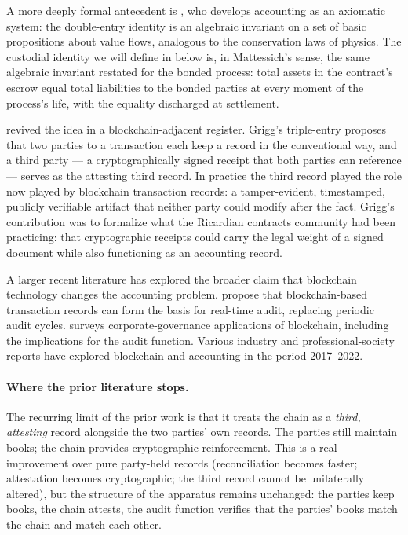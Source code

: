 \documentclass[11pt,a4paper]{article}
\theoremstyle{definition}
\theoremstyle{remark}
\begin{document}
A more deeply formal antecedent is
\citet{mattessich1964accounting}, who develops accounting as an
axiomatic system: the double-entry identity is an algebraic
invariant on a set of basic propositions about value flows,
analogous to the conservation laws of physics. The custodial
identity we will define in
 below is, in Mattessich's sense,
the same algebraic invariant restated for the bonded process:
total assets in the contract's escrow equal total liabilities to
the bonded parties at every moment of the process's life, with
the equality discharged at settlement.

\citet{grigg2005triple} revived the idea in a
blockchain-adjacent register. Grigg's triple-entry proposes
that two parties to a transaction each keep a record in the
conventional way, and a third party --- a cryptographically
signed receipt that both parties can reference --- serves as
the attesting third record. In practice the third record
played the role now played by blockchain transaction records:
a tamper-evident, timestamped, publicly verifiable artifact
that neither party could modify after the fact. Grigg's
contribution was to formalize what the Ricardian contracts
community had been practicing: that cryptographic receipts
could carry the legal weight of a signed document while also
functioning as an accounting record.

A larger recent literature has explored the broader claim that
blockchain technology changes the accounting problem.
\citet{dai2017toward} propose that blockchain-based transaction
records can form the basis for real-time audit, replacing
periodic audit cycles. \citet{yermack2017corporate} surveys
corporate-governance applications of blockchain, including
the implications for the audit function. Various industry and
professional-society reports have explored blockchain and
accounting in the period 2017--2022.

\paragraph{Where the prior literature stops.}
The recurring limit of the prior work is that it treats the
chain as a \emph{third, attesting} record alongside the two
parties' own records. The parties still maintain books; the
chain provides cryptographic reinforcement. This is a real
improvement over pure party-held records (reconciliation
becomes faster; attestation becomes cryptographic; the third
record cannot be unilaterally altered), but the structure of
the apparatus remains unchanged: the parties keep books, the
chain attests, the audit function verifies that the parties'
books match the chain and match each other.
\end{document}
